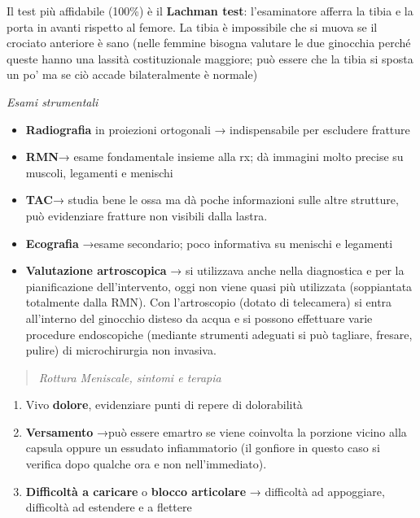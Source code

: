 \documentclass[]{article}
\begin{document}
Il test più affidabile (100\%) è il \textbf{Lachman test}: l'esaminatore
afferra la tibia e la porta in avanti rispetto al femore. La tibia è
impossibile che si muova se il crociato anteriore è sano (nelle femmine
bisogna valutare le due ginocchia perché queste hanno una lassità
costituzionale maggiore; può essere che la tibia si sposta un po' ma se
ciò accade bilateralmente è normale)

\emph{Esami strumentali}

\begin{itemize}
\item
  \textbf{Radiografia} in proiezioni ortogonali → indispensabile per
  escludere fratture
\item
  \textbf{RMN}→ esame fondamentale insieme alla rx; dà immagini molto
  precise su muscoli, legamenti e menischi
\item
  \textbf{TAC}→ studia bene le ossa ma dà poche informazioni sulle altre
  strutture, può evidenziare fratture non visibili dalla lastra.
\item
  \textbf{Ecografia} →esame secondario; poco informativa su menischi e
  legamenti
\item
  \textbf{Valutazione artroscopica} → si utilizzava anche nella
  diagnostica e per la pianificazione dell'intervento, oggi non viene
  quasi più utilizzata (soppiantata totalmente dalla RMN). Con
  l'artroscopio (dotato di telecamera) si entra all'interno del
  ginocchio disteso da acqua e si possono effettuare varie procedure
  endoscopiche (mediante strumenti adeguati si può tagliare, fresare,
  pulire) di microchirurgia non invasiva.
\end{itemize}

\begin{quote}
\emph{Rottura Meniscale, sintomi e terapia}
\end{quote}

\begin{enumerate}
\def\labelenumi{\arabic{enumi}.}
\item
  Vivo \textbf{dolore}, evidenziare punti di repere di dolorabilità
\item
  \textbf{Versamento} →può essere emartro se viene coinvolta la porzione
  vicino alla capsula oppure un essudato infiammatorio (il gonfiore in
  questo caso si verifica dopo qualche ora e non nell'immediato).
\item
  \textbf{Difficoltà a caricare} o \textbf{blocco articolare} →
  difficoltà ad appoggiare, difficoltà ad estendere e a flettere
\end{enumerate}
\end{document}
